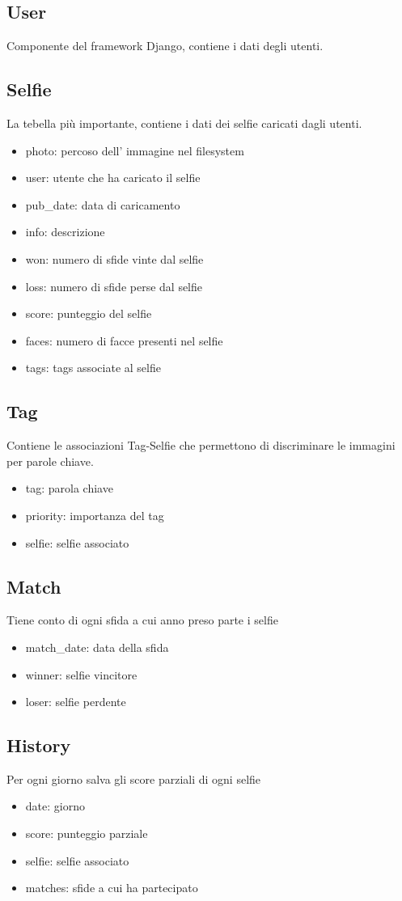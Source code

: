 \documentclass{article}
\begin{document}
\subsection{User}
Componente del framework Django, contiene i dati degli utenti.

\subsection{Selfie}
La tebella più importante, contiene i dati dei selfie caricati dagli utenti.
\begin{itemize}
\item photo: percoso dell' immagine nel filesystem
\item user: utente che ha caricato il selfie
\item pub\_date: data di caricamento
\item info: descrizione
\item won: numero di sfide vinte dal selfie
\item loss: numero di sfide perse dal selfie
\item score: punteggio del selfie
\item faces: numero di facce presenti nel selfie
\item tags: tags associate al selfie
\end{itemize}

\subsection{Tag}
Contiene le associazioni Tag-Selfie che permettono di discriminare le immagini per parole chiave.
\begin{itemize}
\item tag: parola chiave
\item priority: importanza del tag
\item selfie: selfie associato
\end{itemize}

\subsection{Match}
Tiene conto di ogni sfida a cui anno preso parte i selfie
\begin{itemize}
\item match\_date: data della sfida
\item winner: selfie vincitore
\item loser: selfie perdente
\end{itemize}

\subsection{History}
Per ogni giorno salva gli score parziali di ogni selfie
\begin{itemize}
\item date: giorno
\item score: punteggio parziale
\item selfie: selfie associato
\item matches: sfide a cui ha partecipato
\end{itemize}
\end{document}
